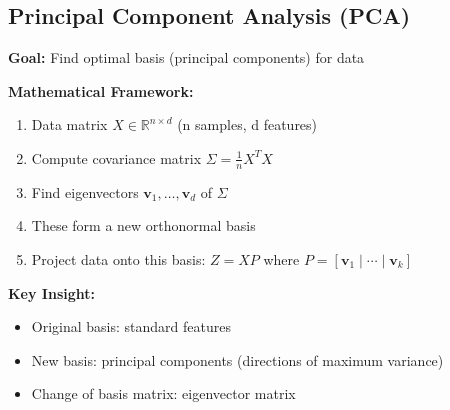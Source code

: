 \documentclass[12pt,a4paper]{article}
\theoremstyle{definition}
\begin{document}
\subsection{Principal Component Analysis (PCA)}

\begin{tcolorbox}[enhanced,breakable,colback=green!5!white,colframe=green!75!black,title=PCA as Change of Basis]
\textbf{Goal:} Find optimal basis (principal components) for data

\textbf{Mathematical Framework:}
\begin{enumerate}
    \item Data matrix $X \in \mathbb{R}^{n \times d}$ (n samples, d features)
    \item Compute covariance matrix $\Sigma = \frac{1}{n}X^TX$
    \item Find eigenvectors $\mathbf{v}_1, \ldots, \mathbf{v}_d$ of $\Sigma$
    \item These form a new orthonormal basis
    \item Project data onto this basis: $Z = XP$ where $P = [\mathbf{v}_1 \mid \cdots \mid \mathbf{v}_k]$
\end{enumerate}

\textbf{Key Insight:}
\begin{itemize}
    \item Original basis: standard features
    \item New basis: principal components (directions of maximum variance)
    \item Change of basis matrix: eigenvector matrix
\end{itemize}
\end{tcolorbox}
\end{document}
